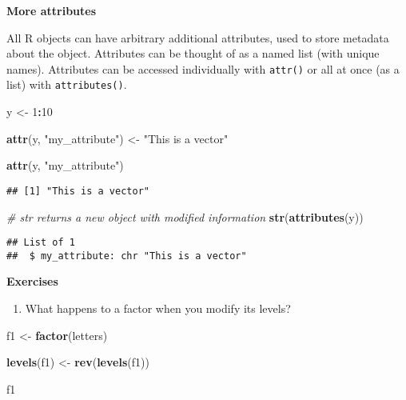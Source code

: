 \documentclass[
]{book}
\newenvironment{Shaded}{\begin{snugshade}}{\end{snugshade}}
\newcommand{\CommentTok}[1]{\textcolor[rgb]{0.56,0.35,0.01}{\textit{#1}}}
\newcommand{\DecValTok}[1]{\textcolor[rgb]{0.00,0.00,0.81}{#1}}
\newcommand{\KeywordTok}[1]{\textcolor[rgb]{0.13,0.29,0.53}{\textbf{#1}}}
\newcommand{\NormalTok}[1]{#1}
\newcommand{\OperatorTok}[1]{\textcolor[rgb]{0.81,0.36,0.00}{\textbf{#1}}}
\newcommand{\StringTok}[1]{\textcolor[rgb]{0.31,0.60,0.02}{#1}}
\providecommand{\tightlist}{%
  \setlength{\itemsep}{0pt}\setlength{\parskip}{0pt}}
\begin{document}
\textbf{More attributes}

All R objects can have arbitrary additional attributes, used to store metadata about the object. Attributes can be thought of as a named list (with unique names). Attributes can be accessed individually with \texttt{attr()} or all at once (as a list) with \texttt{attributes()}.

\begin{Shaded}
\begin{Highlighting}[]
\NormalTok{y \textless{}{-}}\StringTok{ }\DecValTok{1}\OperatorTok{:}\DecValTok{10}

\KeywordTok{attr}\NormalTok{(y, }\StringTok{"my\_attribute"}\NormalTok{) \textless{}{-}}\StringTok{ "This is a vector"}

\KeywordTok{attr}\NormalTok{(y, }\StringTok{"my\_attribute"}\NormalTok{)}
\end{Highlighting}
\end{Shaded}

\begin{verbatim}
## [1] "This is a vector"
\end{verbatim}

\begin{Shaded}
\begin{Highlighting}[]
\CommentTok{\# str returns a new object with modified information}
\KeywordTok{str}\NormalTok{(}\KeywordTok{attributes}\NormalTok{(y))}
\end{Highlighting}
\end{Shaded}

\begin{verbatim}
## List of 1
##  $ my_attribute: chr "This is a vector"
\end{verbatim}

\textbf{Exercises}

\begin{enumerate}
\def\labelenumi{\arabic{enumi}.}
\tightlist
\item
  What happens to a factor when you modify its levels?
\end{enumerate}

\begin{Shaded}
\begin{Highlighting}[]
\NormalTok{f1 \textless{}{-}}\StringTok{ }\KeywordTok{factor}\NormalTok{(letters)}

\KeywordTok{levels}\NormalTok{(f1) \textless{}{-}}\StringTok{ }\KeywordTok{rev}\NormalTok{(}\KeywordTok{levels}\NormalTok{(f1))}

\NormalTok{f1}
\end{Highlighting}
\end{Shaded}
\end{document}
